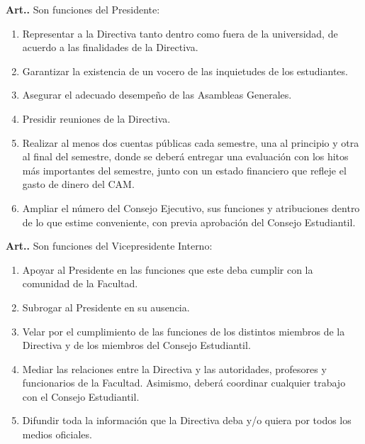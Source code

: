 \documentclass[letterpaper,11pt]{article}
\newcounter{art}
\newenvironment{art}{\refstepcounter{art}\textbf{Art.{\space}\theart.}}{}
\begin{document}
\begin{art}\label{funcionesPresidente}
    Son funciones del Presidente:
    \begin{enumerate}
        \item Representar a la Directiva tanto dentro como fuera de la universidad, de acuerdo a las finalidades de la Directiva.
        \item Garantizar la existencia de un vocero de las inquietudes de los estudiantes.
        \item Asegurar el adecuado desempeño de las Asambleas Generales.
        \item Presidir reuniones de la Directiva.
        \item Realizar al menos dos cuentas públicas cada semestre, una al principio y otra al final del semestre, donde se deberá entregar una evaluación con los hitos más importantes del semestre, junto con un estado financiero que refleje el gasto de dinero del CAM.
        \item Ampliar el número del Consejo Ejecutivo, sus funciones y atribuciones dentro de lo que estime conveniente, con previa aprobación del Consejo Estudiantil.
    \end{enumerate}
\end{art}

\begin{art}\label{funcionesVicepresidenteInterno}
    Son funciones del Vicepresidente Interno:
    \begin{enumerate}
        \item Apoyar al Presidente en las funciones que este deba cumplir con la comunidad de la Facultad.
        \item Subrogar al Presidente en su ausencia.
        \item Velar por el cumplimiento de las funciones de los distintos miembros de la Directiva y de los miembros del Consejo Estudiantil.
        \item Mediar las relaciones entre la Directiva y las autoridades, profesores y funcionarios de la Facultad. Asimismo, deberá coordinar cualquier trabajo con el Consejo Estudiantil.
        \item Difundir toda la información que la Directiva deba y/o quiera por todos los medios oficiales.
    \end{enumerate}
\end{art}
\end{document}
